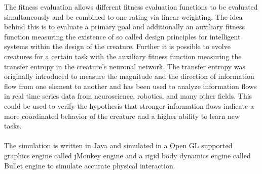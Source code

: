 \documentclass[11pt]{article}
\begin{document}
The fitness evaluation allows different fitness evaluation functions to be evaluated simultaneously and be combined to one rating via linear weighting.
The idea behind this is to evaluate a primary goal and additionally an auxiliary fitness function measuring the existence of so called design principles for intelligent systems within the design of the creature. Further it is possible to evolve creatures for a certain task with the auxiliary fitness function measuring the transfer entropy in the creature's neuronal network. The transfer entropy was originally introduced to measure the magnitude and the direction of information flow from one element to another and has been used to analyze information flows in real time series data from neuroscience, robotics, and many other fields. This could be used to verify the hypothesis that stronger information flows indicate a more coordinated behavior of the creature and a higher ability to learn new tasks.
\\\\
The simulation is written in Java and simulated in a Open GL supported graphics engine called jMonkey engine and a rigid body dynamics engine called Bullet engine to simulate accurate physical interaction.
\end{document}
